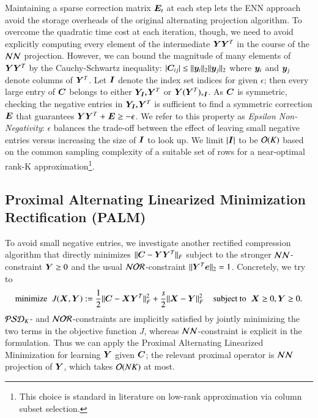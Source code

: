 Maintaining a sparse correction matrix $\bm{E}_t$ at each step lets the ENN
approach avoid the storage overheads of the original alternating projection
algorithm.  To overcome the quadratic time cost at each iteration, though, we
need to avoid explicitly computing every element of the intermediate $\bm{Y} \bm{Y}^T$
in the course of the $\mathcal{NN}$ projection. However, we can bound the magnitude of
many elements of $\bm{Y}\bm{Y}^T$ by the Cauchy-Schwartz inequality: $|\bm{C}_{ij}| \leq
\|\bm{y}_i\|_2 \|\bm{y}_j\|_2$ where $\bm{y}_i$ and $\bm{y}_j$ denote columns of $\bm{Y}^T$.
Let $\bm{I}$ denote the index set indices  for given $\epsilon$; then every large entry of $\bm{C}$ belongs to
either $\bm{Y}_{\bm{I}*}\bm{Y}^T$ or $\bm{Y}(\bm{Y}^T)_{*\bm{I}}$. As $\bm{C}$ is symmetric, checking
the negative entries in $\bm{Y}_{\bm{I}*}\bm{Y}^T$ is sufficient to find a symmetric
correction $\bm{E}$ that guarantees $\bm{Y}\bm{Y}^T \mathrel{+} \bm{E} \mathrel{\geq} -\epsilon$. We refer
to this property as \textit{Epsilon Non-Negativity}: $\epsilon$ balances the
trade-off between the effect of leaving small negative entries versus increasing
the size of $\bm{I}$ to look up. We limit $|\bm{I}|$ to be $\mathcal{O}(K)$ based on the
common sampling complexity of a suitable set of rows for a near\hyp{}optimal
rank\hyp{}K approximation\footnote{This choice is standard in literature on
low-rank approximation via column subset selection.}.

\subsection{Proximal Alternating Linearized Minimization Rectification (PALM)}

To avoid small negative entries, we investigate another rectified compression
algorithm that directly minimizes $\|\bm{C} - \bm{Y} \bm{Y}^T\|_F$ subject to the
stronger $\mathcal{NN}$-constraint $\bm{Y} \mathrel{\geq} 0$ and the usual $\mathcal{NOR}$-constraint $\|\bm{Y}^T
\bm{e}\|_2 \mathrel{=} 1$. Concretely, we try to
\begin{equation}
  \text{minimize} \;\; J(\bm{X}, \bm{Y}) := \frac{1}{2} \| \bm{C} - \bm{X} \bm{Y}^T \|_F^2 + 
  \frac{s}{2} \| \bm{X} - \bm{Y} \|_F^2 \;\;\;\; \text{subject to} \;\; \bm{X} \geq 0, 
  \bm{Y} \geq 0. \label{eqn:palm}
\end{equation}
$\mathcal{PSD}_K$- and $\mathcal{NOR}$-constraints are implicitly satisfied by jointly minimizing
the two terms in the objective function $J$, whereas $\mathcal{NN}$-constraint is
explicit in the formulation. Thus we can apply the Proximal Alternating
Linearized Minimization \cite{bolte2014proximal} for learning $\bm{Y}$ given $\bm{C}$;
the relevant proximal operator is $\mathcal{NN}$ projection of $\bm{Y}$, which takes $\mathcal{O}
(NK)$ at most.

